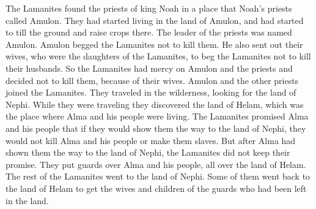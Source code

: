 The Lamanites found the priests of king Noah in a place that Noah's priests called Amulon. They had started living in the land of Amulon, and had started to till the ground and raise crops there.
\bverse \iffalse Now the name of the leader of those priests was Amulon. \fi
The leader of the priests was named Amulon.
\bverse \iffalse And it came to pass that Amulon did plead with the Lamanites; and he also sent forth their wives, who were the daughters of the Lamanites, to plead with their brethren, that they should not destroy their husbands. \fi
Amulon begged the Lamanites not to kill them. He also sent out their wives, who were the daughters of the Lamanites, to beg the Lamanites not to kill their husbands.
\bverse \iffalse And the Lamanites had compassion on Amulon and his brethren, and did not destroy them, because of their wives. \fi
So the Lamanites had mercy on Amulon and the priests and decided not to kill them, because of their wives.
\bverse \iffalse And Amulon and his brethren did join the Lamanites, and they were traveling in the wilderness in search of the land of Nephi when they discovered the land of Helam, which was possessed by Alma and his brethren. \fi
Amulon and the other priests joined the Lamanites. They traveled in the wilderness, looking for the land of Nephi. While they were traveling they discovered the land of Helam, which was the place where Alma and his people were living.
\bverse \iffalse And it came to pass that the Lamanites promised unto Alma and his brethren, that if they would show them the way which led to the land of Nephi that they would grant unto them their lives and their liberty. \fi
The Lamanites promised Alma and his people that if they would show them the way to the land of Nephi, they would not kill Alma and his people or make them slaves.
\bverse \iffalse But after Alma had shown them the way that led to the land of Nephi the Lamanites would not keep their promise; but they set guards round about the land of Helam, over Alma and his brethren. \fi
But after Alma had shown them the way to the land of Nephi, the Lamanites did not keep their promise. They put guards over Alma and his people, all over the land of Helam.
\bverse \iffalse And the remainder of them went to the land of Nephi; and a part of them returned to the land of Helam, and also brought with them the wives and the children of the guards who had been left in the land. \fi
The rest of the Lamanites went to the land of Nephi. Some of them went back to the land of Helam to get the wives and children of the guards who had been left in the land.
